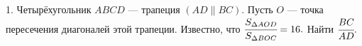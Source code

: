 1. Четырёхугольник $ABCD$ --- трапеция $(AD\parallel BC).$ Пусть $O$ --- точка пересечения диагоналей этой трапеции. Известно, что $\cfrac{S_{\Delta AOD}}{S_{\Delta BOC}}=16.$ Найти $\cfrac{BC}{AD}.$\\
